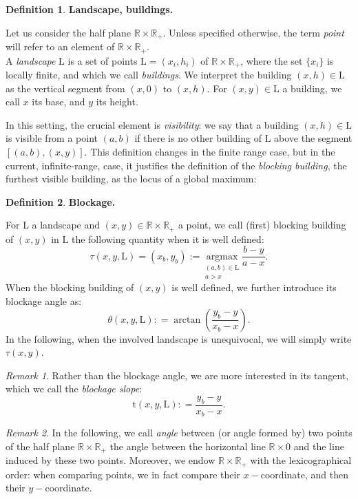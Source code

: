 \documentclass[10pt,english,a4paper]{smfart}
\theoremstyle{definition}
\newtheorem{definition}{Definition}[section]
\theoremstyle{remark}
\newtheorem{remark}{Remark}
\newcommand{\R}{\mathbb{R}}
\newcommand{\landsc}{\mathrm{L}}
\newcommand{\slope}{\mathrm{t}}
\newcommand{\Half}{\R \times \R_+}
\begin{document}
\begin{definition}\textbf{Landscape, buildings.}

    Let us consider the half plane $\R \times \R_+$. Unless specified otherwise, the term \textit{point} will refer to an element of $\Half$.\\
    A \textit{landscape} $\landsc$ is a set of points $\landsc = {(x_i, h_i)}$ of $\R \times \R_+$, where the set $\{x_i\}$ is locally finite, and which we call \textit{buildings}. We interpret the building $(x, h)\in \landsc$ as the vertical segment from $(x, 0)$ to $(x, h)$. For $(x, y)\in \landsc$ a building, we call $x$ its base, and $y$ its height.\\
\end{definition}
In this setting, the crucial element is \textit{visibility}: we say that a building $(x, h)\in \landsc$ is visible from a point $(a, b)$ if there is no other building of $\landsc$ above the segment $[(a, b),(x, y)]$. This definition changes in the finite range case, but in the current, infinite-range, case, it justifies the definition of the \textit{blocking building}, the furthest visible building, as the locus of a global maximum:
\begin{definition}\textbf{Blockage.}

    For $\landsc$ a landscape and $(x, y)\in \Half$ a point, we call (first) blocking building of $(x, y)$ in $\landsc$ the following quantity when it is well defined:
    \[\tau(x, y, \landsc) = (x_b, y_b) := \underset{\substack{(a, b) \in \landsc \\a>x}}{\text{argmax}} \frac{b-y}{a-x}.\]
    When the blocking building of $(x, y)$ is well defined, we further introduce its blockage angle as:
    \[\theta(x, y, \landsc): = \arctan\left(\frac{y_b - y}{x_b-x}\right).\]
    In the following, when the involved landscape is unequivocal, we will simply write $\tau(x, y)$.
\end{definition}

\begin{remark}
Rather than the blockage angle, we are more interested in its tangent, which we call the \textit{blockage slope}:
\[\slope(x, y, \landsc): = \frac{y_b - y}{x_b-x}.\]
\end{remark}
\begin{remark}
In the following, we call \textit{angle} between (or angle formed by) two points of the half plane $\Half$ the angle between the horizontal line $\R \times {0}$ and the line induced by these two points. Moreover, we endow $\Half$ with the lexicographical order: when comparing points, we in fact compare their $x-$coordinate, and then their $y-$coordinate.
\end{remark}
\end{document}
